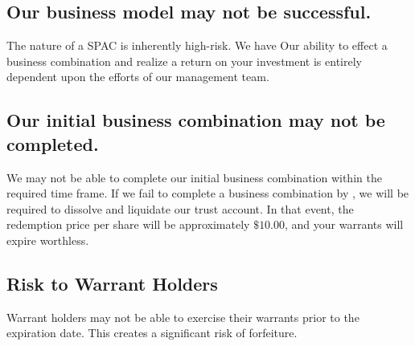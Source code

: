 
\subsection{Our business model may not be successful.}
The nature of a SPAC is inherently high-risk. We have   Our ability to effect a business combination and realize a return on your investment is entirely dependent upon the efforts of our management team.

\subsection{Our initial business combination may not be completed.}
We may not be able to complete our initial business combination within the required time frame. If we fail to complete a business combination by , we will be required to dissolve and liquidate our trust account. In that event, the redemption price per share will be approximately $\$10.00$, and your warrants will expire worthless.

\subsection{Risk to Warrant Holders}
Warrant holders may not be able to exercise their warrants prior to the expiration date.  This creates a significant risk of forfeiture.